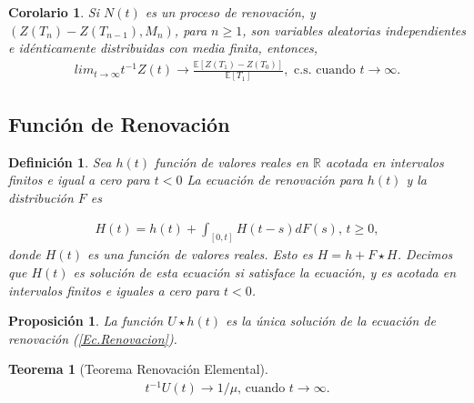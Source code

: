 \documentclass{article}
\newtheorem{Def}{Definición}
\newtheorem{Teo}{Teorema}
\newtheorem{Prop}{Proposición}
\newtheorem{Coro}{Corolario}
\newcommand{\rea}{\mathbb{R}}
\newcommand{\esp}{\mathbb{E}}
\begin{document}
\begin{Coro}
Si $N\left(t\right)$ es un proceso de renovaci\'on, y $\left(Z\left(T_{n}\right)-Z\left(T_{n-1}\right),M_{n}\right)$, para $n\geq1$, son variables aleatorias independientes e id\'enticamente distribuidas con media finita, entonces,
\begin{eqnarray}
lim_{t\rightarrow\infty}t^{-1}Z\left(t\right)\rightarrow\frac{\esp\left[Z\left(T_{1}\right)-Z\left(T_{0}\right)\right]}{\esp\left[T_{1}\right]},\textrm{ c.s. cuando  }t\rightarrow\infty.
\end{eqnarray}
\end{Coro}

%
\subsection{Funci\'on de Renovaci\'on}
%


\begin{Def}
Sea $h\left(t\right)$ funci\'on de valores reales en $\rea$ acotada en intervalos finitos e igual a cero para $t<0$ La ecuaci\'on de renovaci\'on para $h\left(t\right)$ y la distribuci\'on $F$ es

\begin{eqnarray}\label{Ec.Renovacion}
H\left(t\right)=h\left(t\right)+\int_{\left[0,t\right]}H\left(t-s\right)dF\left(s\right)\textrm{,    }t\geq0,
\end{eqnarray}
donde $H\left(t\right)$ es una funci\'on de valores reales. Esto es $H=h+F\star H$. Decimos que $H\left(t\right)$ es soluci\'on de esta ecuaci\'on si satisface la ecuaci\'on, y es acotada en intervalos finitos e iguales a cero para $t<0$.
\end{Def}

\begin{Prop}
La funci\'on $U\star h\left(t\right)$ es la \'unica soluci\'on de la ecuaci\'on de renovaci\'on (\ref{Ec.Renovacion}).
\end{Prop}

\begin{Teo}[Teorema Renovaci\'on Elemental]
\begin{eqnarray*}
t^{-1}U\left(t\right)\rightarrow 1/\mu\textrm{,    cuando }t\rightarrow\infty.
\end{eqnarray*}
\end{Teo}
\end{document}
